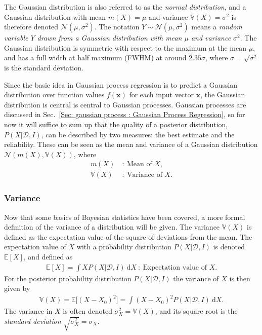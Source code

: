 \documentclass[twoside,english]{uiofysmaster}
\begin{document}
{The Gaussian distribution is also referred to as the \textit{normal distribution}, and a Gaussian distribution with mean $m(X)= \mu$ and variance $\mathbb{V}(X)=\sigma^2$ is therefore denoted $\mathcal{N}(\mu, \sigma^2)$. The notation $Y \sim \mathcal{N}(\mu, \sigma^2)$ means a \textit{random variable $Y$ drawn from a Gaussian distribution with mean $\mu$ and variance $\sigma^2$}. The Gaussian distribution is symmetric with respect to the maximum at the mean $\mu$, and has a full width at half maximum (FWHM) at around $2.35 \sigma$, where $\sigma = \sqrt{\sigma^2}$ is the standard deviation.  

Since the basic idea in Gaussian process regression is to predict a Gaussian distribution over function values $f(\textbf{x})$ for each input vector $\textbf{x}$, the Gaussian distribution is central is central to Gaussian processes. Gaussian processes are discussed in Sec.~\ref{Sec: gaussian process : Gaussian Process Regression}, so for now it will suffice to sum up that the quality of a posterior distribution, $P(X| \mathcal{D}, I)$, can be described by two measures: the best estimate and the reliability. These can be seen as the mean and variance of a Gaussian distribution $\mathcal{N}(m(X), \mathbb{V}(X))$, where
\begin{align}
m(X)~&:~ \text{Mean of }X,\\
\mathbb{V}(X)~&:~ \text{Variance of }X.
\end{align}


\subsubsection{Variance}

Now that some basics of Bayesian statistics have been covered, a more formal definition of the variance of a distribution will be given. The variance $\mathbb{V} (X)$ is defined as the expectation value of the square of deviations from the mean. The expectation value of $X$ with a probability distribution $P(X | \mathcal{D}, I)$ is denoted $\mathbb{E}[X]$, and defined as
\begin{align}
\mathbb{E}[X] = \int X P(X | \mathcal{D}, I) ~\text{d}X ~:~ \text{Expectation value of }X.
\end{align}
 For the posterior probability distribution $P(X| \mathcal{D}, I)$ the variance of $X$ is then given by \cite{sivia2006data}
\begin{align}\label{Eq:: gaussian process : variance X 1dim}
\mathbb{V}(X) = \mathbb{E} \big[ (X - X_0)^2 \big] = \int  (X - X_0)^2 P (X| \mathcal{D}, I) ~\text{d}X.
\end{align}
The variance in $X$ is often denoted $\sigma_X^2 = \mathbb{V}(X)$, and its square root is the \textit{standard deviation} $\sqrt{\sigma^2_X} = \sigma_X$. 



}
\end{document}
